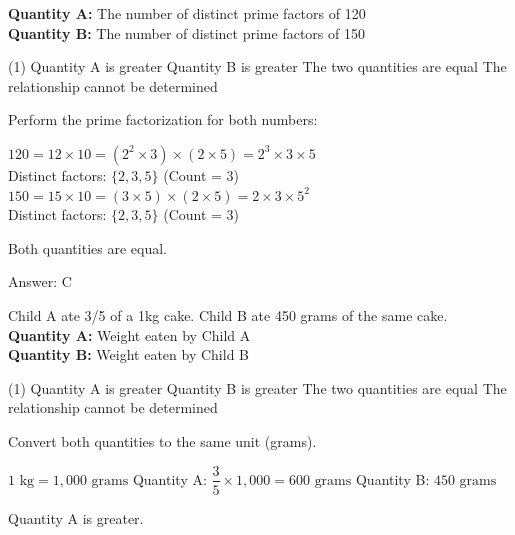 \documentclass[11pt,paper=a4,answers]{exam}
\begin{document}
\begin{questions}
\question
\textbf{Quantity A: } The number of distinct prime factors of 120 \\
\vspace{5pt}
\textbf{Quantity B: } The number of distinct prime factors of 150

\begin{tasks}(1)
\task[A)] Quantity A is greater
\task[B)] Quantity B is greater
\task[C)] The two quantities are equal
\task[D)] The relationship cannot be determined
\end{tasks}

\begin{solution}
Perform the prime factorization for both numbers:
\vspace{5pt}
\begin{center}
$120 = 12 \times 10 = (2^2 \times 3) \times (2 \times 5) = 2^3 \times 3 \times 5$ \\
Distinct factors: $\{2, 3, 5\}$ (Count = 3)
\vspace{10pt}
$150 = 15 \times 10 = (3 \times 5) \times (2 \times 5) = 2 \times 3 \times 5^2$ \\
Distinct factors: $\{2, 3, 5\}$ (Count = 3)
\end{center}
\vspace{5pt}
Both quantities are equal.

Answer: \colorbox{yellow!100}{C}
\end{solution}

\vspace{1cm}

\question
Child A ate 3/5 of a 1kg cake. Child B ate 450 grams of the same cake.
\vspace{5pt}
\textbf{Quantity A: } Weight eaten by Child A \\
\vspace{5pt}
\textbf{Quantity B: } Weight eaten by Child B

\begin{tasks}(1)
\task[A)] Quantity A is greater
\task[B)] Quantity B is greater
\task[C)] The two quantities are equal
\task[D)] The relationship cannot be determined
\end{tasks}

\begin{solution}
Convert both quantities to the same unit (grams).
\vspace{5pt}
\begin{center}
$1\text{ kg} = 1,000\text{ grams}$
\vspace{5pt}
Quantity A: $\dfrac{3}{5} \times 1,000 = 600\text{ grams}$
\vspace{5pt}
Quantity B: $450\text{ grams}$
\end{center}
\vspace{5pt}
Quantity A is greater.


\end{solution}
\end{questions}
\end{document}
